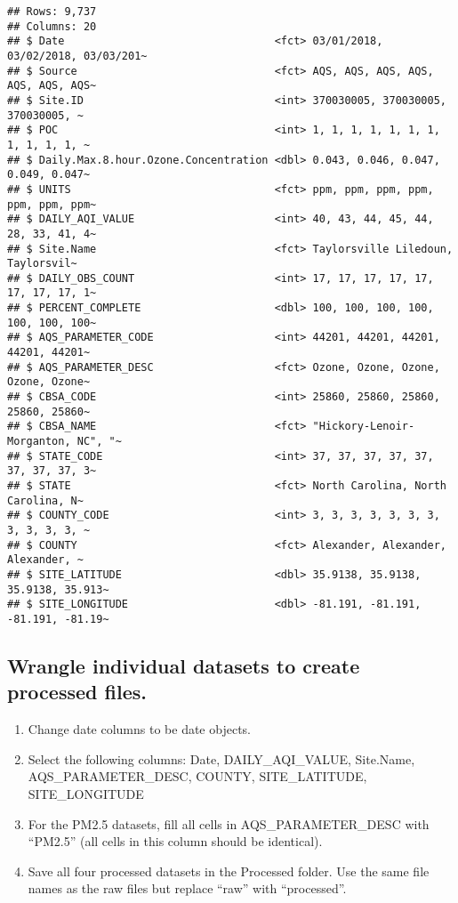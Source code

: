 \documentclass[
]{article}
\begin{document}
\begin{verbatim}
## Rows: 9,737
## Columns: 20
## $ Date                                 <fct> 03/01/2018, 03/02/2018, 03/03/201~
## $ Source                               <fct> AQS, AQS, AQS, AQS, AQS, AQS, AQS~
## $ Site.ID                              <int> 370030005, 370030005, 370030005, ~
## $ POC                                  <int> 1, 1, 1, 1, 1, 1, 1, 1, 1, 1, 1, ~
## $ Daily.Max.8.hour.Ozone.Concentration <dbl> 0.043, 0.046, 0.047, 0.049, 0.047~
## $ UNITS                                <fct> ppm, ppm, ppm, ppm, ppm, ppm, ppm~
## $ DAILY_AQI_VALUE                      <int> 40, 43, 44, 45, 44, 28, 33, 41, 4~
## $ Site.Name                            <fct> Taylorsville Liledoun, Taylorsvil~
## $ DAILY_OBS_COUNT                      <int> 17, 17, 17, 17, 17, 17, 17, 17, 1~
## $ PERCENT_COMPLETE                     <dbl> 100, 100, 100, 100, 100, 100, 100~
## $ AQS_PARAMETER_CODE                   <int> 44201, 44201, 44201, 44201, 44201~
## $ AQS_PARAMETER_DESC                   <fct> Ozone, Ozone, Ozone, Ozone, Ozone~
## $ CBSA_CODE                            <int> 25860, 25860, 25860, 25860, 25860~
## $ CBSA_NAME                            <fct> "Hickory-Lenoir-Morganton, NC", "~
## $ STATE_CODE                           <int> 37, 37, 37, 37, 37, 37, 37, 37, 3~
## $ STATE                                <fct> North Carolina, North Carolina, N~
## $ COUNTY_CODE                          <int> 3, 3, 3, 3, 3, 3, 3, 3, 3, 3, 3, ~
## $ COUNTY                               <fct> Alexander, Alexander, Alexander, ~
## $ SITE_LATITUDE                        <dbl> 35.9138, 35.9138, 35.9138, 35.913~
## $ SITE_LONGITUDE                       <dbl> -81.191, -81.191, -81.191, -81.19~
\end{verbatim}

\hypertarget{wrangle-individual-datasets-to-create-processed-files.}{%
\subsection{Wrangle individual datasets to create processed
files.}\label{wrangle-individual-datasets-to-create-processed-files.}}

\begin{enumerate}
\def\labelenumi{\arabic{enumi}.}
\setcounter{enumi}{2}
\item
  Change date columns to be date objects.
\item
  Select the following columns: Date, DAILY\_AQI\_VALUE, Site.Name,
  AQS\_PARAMETER\_DESC, COUNTY, SITE\_LATITUDE, SITE\_LONGITUDE
\item
  For the PM2.5 datasets, fill all cells in AQS\_PARAMETER\_DESC with
  ``PM2.5'' (all cells in this column should be identical).
\item
  Save all four processed datasets in the Processed folder. Use the same
  file names as the raw files but replace ``raw'' with ``processed''.
\end{enumerate}
\end{document}
